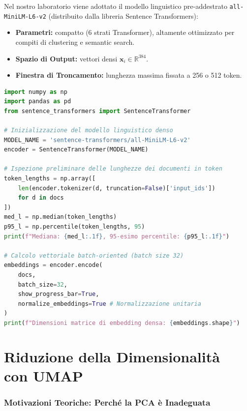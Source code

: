 Nel nostro laboratorio viene adottato il modello linguistico pre-addestrato \texttt{all-MiniLM-L6-v2} (distribuito dalla libreria Sentence Transformers):
\begin{itemize}
    \item \textbf{Parametri:} compatto (6 strati Transformer), altamente ottimizzato per compiti di clustering e semantic search.
    \item \textbf{Spazio di Output:} vettori densi $\mathbf{x}_i \in \mathbb{R}^{384}$.
    \item \textbf{Finestra di Troncamento:} lunghezza massima fissata a 256 o 512 token.
\end{itemize}

\begin{lstlisting}[language=Python, caption={Estrazione degli embedding di documento con Sentence Transformers.}]
import numpy as np
import pandas as pd
from sentence_transformers import SentenceTransformer

# Inizializzazione del modello linguistico denso
MODEL_NAME = 'sentence-transformers/all-MiniLM-L6-v2'
encoder = SentenceTransformer(MODEL_NAME)

# Ispezione preliminare delle lunghezze dei documenti in token
token_lengths = np.array([
    len(encoder.tokenizer(d, truncation=False)['input_ids'])
    for d in docs
])
med_l = np.median(token_lengths)
p95_l = np.percentile(token_lengths, 95)
print(f"Mediana: {med_l:.1f}, 95-esimo percentile: {p95_l:.1f}")

# Calcolo vettoriale batch-oriented (batch size 32)
embeddings = encoder.encode(
    docs, 
    batch_size=32, 
    show_progress_bar=True, 
    normalize_embeddings=True # Normalizzazione unitaria
)
print(f"Dimensioni matrice di embedding densa: {embeddings.shape}")
\end{lstlisting}

\FloatBarrier
\section[Riduzione Dimensionalità con UMAP]{Riduzione della Dimensionalità\\con UMAP}
\label{sec:lab-umap-reduction}

\FloatBarrier
\subsubsection{Motivazioni Teoriche: Perché la PCA è Inadeguata}
\label{subsec:lab-why-umap}

